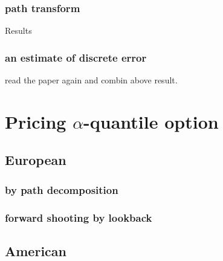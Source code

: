 \documentclass[11pt]{book}
\begin{document}
\subsection{path transform}
Results\cite{Chaumont1999}

\subsection{an estimate of discrete error}
read the paper again and combin above result. 

\chapter{Pricing $\alpha$-quantile option}
\section{European}
\subsection{by path decomposition}

\subsection{forward shooting by lookback}


\section{American}

{}

\end{document}
